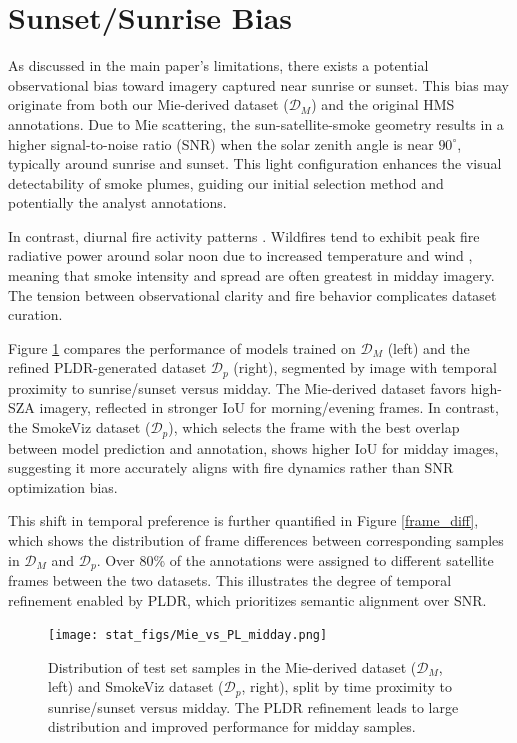 \documentclass{article}
\begin{document}
\section{Sunset/Sunrise Bias}

As discussed in the main paper's limitations, there exists a potential observational bias toward imagery captured near sunrise or sunset. This bias may originate from both our Mie-derived dataset (\(\mathcal{D}_M\)) and the original HMS annotations. Due to Mie scattering, the sun-satellite-smoke geometry results in a higher signal-to-noise ratio (SNR) when the solar zenith angle is near \(90^{\circ}\), typically around sunrise and sunset. This light configuration enhances the visual detectability of smoke plumes, guiding our initial selection method and potentially the analyst annotations.

In contrast, diurnal fire activity patterns . Wildfires tend to exhibit peak fire radiative power around solar noon due to increased temperature and wind \cite{diurnal}, meaning that smoke intensity and spread are often greatest in midday imagery. The tension between observational clarity and fire behavior complicates dataset curation.

Figure \ref{DM_vs_DP} compares the performance of models trained on \(\mathcal{D}_M\) (left) and the refined PLDR-generated dataset \(\mathcal{D}_p\) (right), segmented by image with temporal proximity to sunrise/sunset versus midday. The Mie-derived dataset favors high-SZA imagery, reflected in stronger IoU for morning/evening frames. In contrast, the SmokeViz dataset (\(\mathcal{D}_p\)), which selects the frame with the best overlap between model prediction and annotation, shows higher IoU for midday images, suggesting it more accurately aligns with fire dynamics rather than SNR optimization bias.

This shift in temporal preference is further quantified in Figure \ref{frame_diff}, which shows the distribution of frame differences between corresponding samples in \(\mathcal{D}_M\) and \(\mathcal{D}_p\). Over 80\% of the annotations were assigned to different satellite frames between the two datasets. This illustrates the degree of temporal refinement enabled by PLDR, which prioritizes semantic alignment over SNR.

\begin{figure}[!htb]
    \centering
    \texttt{[image: stat\_figs/Mie\_vs\_PL\_midday.png]}
    \caption{Distribution of test set samples in the Mie-derived dataset (\(\mathcal{D}_M\), left) and SmokeViz dataset (\(\mathcal{D}_p\), right), split by time proximity to sunrise/sunset versus midday. The PLDR refinement leads to large distribution and improved performance for midday samples.}
    \label{DM_vs_DP}
\end{figure}
\end{document}
